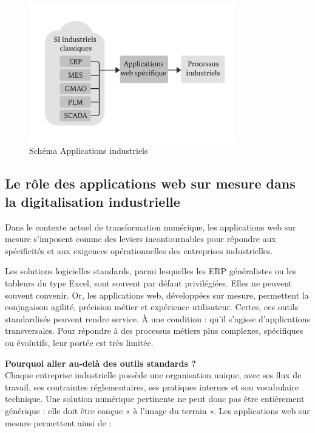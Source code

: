 \documentclass[11pt,a4paper]{article}
\begin{document}
\begin{figure}[H]
    \centering
    \includegraphics[width=0.8\textwidth]{../Images/app-si.png}
    \caption{Schéma Applications industriels}
\end{figure}

\subsection{Le rôle des applications web sur mesure dans la digitalisation industrielle}

Dans le contexte actuel de transformation numérique, les applications web sur mesure s’imposent comme des leviers incontournables pour répondre aux spécificités et aux exigences opérationnelles des entreprises industrielles.

Les solutions logicielles standards, parmi lesquelles les ERP généralistes ou les tableurs du type Excel, sont souvent par défaut privilégiées. Elles ne peuvent souvent convenir. Or, les applications web, développées sur mesure, permettent la conjugaison agilité, précision métier et expérience utilisateur. Certes, ces outils standardisés peuvent rendre service. À une condition : qu’il s’agisse d’applications transversales. Pour répondre à des processus métiers plus complexes, spécifiques ou évolutifs, leur portée est très limitée.


\vspace{1em}
\textbf{Pourquoi aller au-delà des outils standards ?}  \\

Chaque entreprise industrielle possède une organisation unique, avec ses flux de travail, ses contraintes réglementaires, ses pratiques internes et son vocabulaire technique. Une solution numérique pertinente ne peut donc pas être entièrement générique : elle doit être conçue « à l’image du terrain ». Les applications web sur mesure permettent ainsi de :
\end{document}
